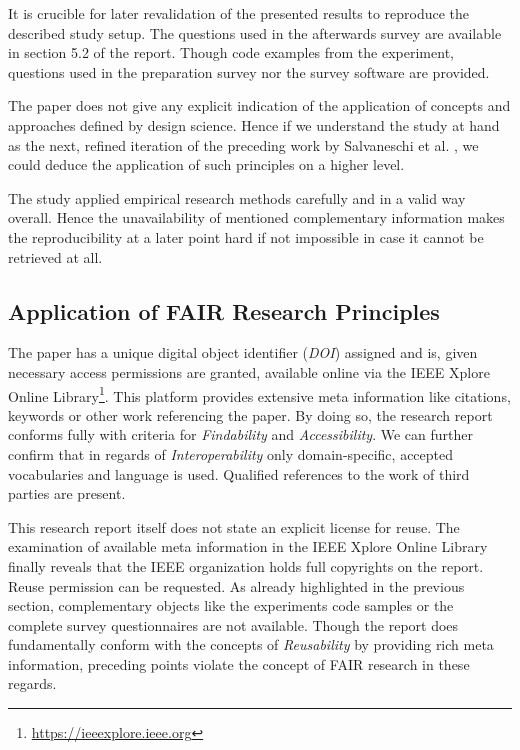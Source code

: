 \documentclass[12pt,a4paper]{article}
\begin{document}
It is crucible for later revalidation of the presented results to reproduce the described study setup. The questions used in the afterwards survey are available in section 5.2 of the report. Though code examples from the experiment, questions used in the preparation survey nor the survey software are provided.

The paper does not give any explicit indication of the application of concepts and approaches defined by design science. Hence if we understand the  study at hand as the next, refined iteration of the preceding work by Salvaneschi et al. \cite{Salvaneschi:2014:ESP:2635868.2635895}, we could deduce the application of such principles on a higher level.

The study applied empirical research methods carefully and in a valid way overall. Hence the unavailability of mentioned complementary information makes the reproducibility at a later point hard if not impossible in case it cannot be retrieved at all.

\subsection{Application of FAIR Research Principles}

The paper has a unique digital object identifier (\emph{DOI}) assigned and is, given necessary access permissions are granted, available online via the IEEE Xplore Online Library\footnote{\url{https://ieeexplore.ieee.org}}. This platform provides extensive meta information like citations, keywords or other work referencing the paper. By doing so, the research report conforms fully with criteria for \emph{Findability} and \emph{Accessibility}. We can further confirm that in regards of \emph{Interoperability} only domain-specific, accepted vocabularies and language is used. Qualified references to the work of third parties are present.

This research report itself does not state an explicit license for reuse. The examination of available meta information in the IEEE Xplore Online Library finally reveals that the IEEE organization holds full copyrights on the report. Reuse permission can be requested. As already highlighted in the previous section, complementary objects like the experiments code samples or the complete survey questionnaires are not available. Though the report does fundamentally conform with the concepts of \emph{Reusability} by providing rich meta information, preceding points violate the concept of FAIR research in these regards.
\end{document}
